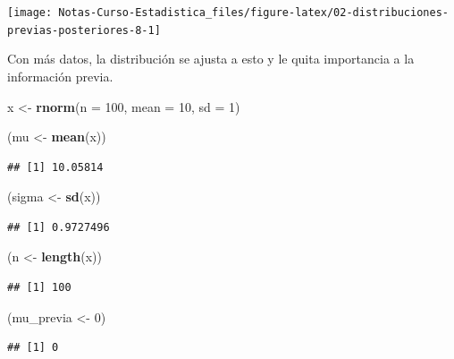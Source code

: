 \documentclass[
  12pt,
]{book}
\newenvironment{Shaded}{\begin{snugshade}}{\end{snugshade}}
\newcommand{\DataTypeTok}[1]{\textcolor[rgb]{0.13,0.29,0.53}{#1}}
\newcommand{\DecValTok}[1]{\textcolor[rgb]{0.00,0.00,0.81}{#1}}
\newcommand{\KeywordTok}[1]{\textcolor[rgb]{0.13,0.29,0.53}{\textbf{#1}}}
\newcommand{\NormalTok}[1]{#1}
\newcommand{\StringTok}[1]{\textcolor[rgb]{0.31,0.60,0.02}{#1}}
\begin{document}
\begin{center}\texttt{[image: Notas-Curso-Estadistica\_files/figure-latex/02-distribuciones-previas-posteriores-8-1]} \end{center}

Con más datos, la distribución se ajusta a esto y le quita importancia a la información previa.

\begin{Shaded}
\begin{Highlighting}[]
\NormalTok{x \textless{}{-}}\StringTok{ }\KeywordTok{rnorm}\NormalTok{(}\DataTypeTok{n =} \DecValTok{100}\NormalTok{, }\DataTypeTok{mean =} \DecValTok{10}\NormalTok{, }\DataTypeTok{sd =} \DecValTok{1}\NormalTok{)}

\NormalTok{(mu \textless{}{-}}\StringTok{ }\KeywordTok{mean}\NormalTok{(x))}
\end{Highlighting}
\end{Shaded}

\begin{verbatim}
## [1] 10.05814
\end{verbatim}

\begin{Shaded}
\begin{Highlighting}[]
\NormalTok{(sigma \textless{}{-}}\StringTok{ }\KeywordTok{sd}\NormalTok{(x))}
\end{Highlighting}
\end{Shaded}

\begin{verbatim}
## [1] 0.9727496
\end{verbatim}

\begin{Shaded}
\begin{Highlighting}[]
\NormalTok{(n \textless{}{-}}\StringTok{ }\KeywordTok{length}\NormalTok{(x))}
\end{Highlighting}
\end{Shaded}

\begin{verbatim}
## [1] 100
\end{verbatim}

\begin{Shaded}
\begin{Highlighting}[]
\NormalTok{(mu\_previa \textless{}{-}}\StringTok{ }\DecValTok{0}\NormalTok{)}
\end{Highlighting}
\end{Shaded}

\begin{verbatim}
## [1] 0
\end{verbatim}
\end{document}
